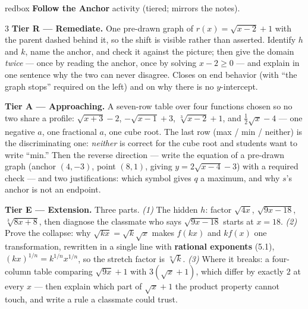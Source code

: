 \documentclass[10pt]{article}
\begin{document}
\begin{skillbox}{redbox}
\textbf{Follow the Anchor} activity (tiered; mirrors the notes).
\begin{multicols}{3}
\textbf{Tier R --- Remediate.} One pre-drawn graph of $r(x)=\sqrt{x-2}+1$ with the parent dashed
behind it, so the shift is visible rather than asserted. Identify $h$ and $k$, name the anchor, and
check it against the picture; then give the domain \emph{twice} --- once by reading the anchor, once
by solving $x-2\ge0$ --- and explain in one sentence why the two can never disagree. Closes on end
behavior (with ``the graph stops'' required on the left) and on why there is no $y$-intercept.

\columnbreak
\textbf{Tier A --- Approaching.} A seven-row table over four functions chosen so no two share a
profile: $\sqrt{x+3}-2$, $-\sqrt{x-1}+3$, $\sqrt[3]{x-2}+1$, and $\frac12\sqrt{x}-4$ --- one negative
$a$, one fractional $a$, one cube root. The last row (max / min / neither) is the discriminating one:
\emph{neither} is correct for the cube root and students want to write ``min.'' Then the reverse
direction --- write the equation of a pre-drawn graph (anchor $(4,-3)$, point $(8,1)$, giving
$y=2\sqrt{x-4}-3$) with a required check --- and two justifications: which symbol gives $q$ a maximum,
and why $s$'s anchor is not an endpoint.

\columnbreak
\textbf{Tier E --- Extension.} Three parts. \emph{(1)} The hidden $h$: factor $\sqrt{4x}$,
$\sqrt{9x-18}$, $\sqrt[3]{8x+8}$, then diagnose the classmate who says $\sqrt{9x-18}$ starts at
$x=18$. \emph{(2)} Prove the collapse: why $\sqrt{kx}=\sqrt{k}\sqrt{x}$ makes $f(kx)$ and $kf(x)$ one
transformation, rewritten in a single line with \textbf{rational exponents} (5.1),
$(kx)^{1/n}=k^{1/n}x^{1/n}$, so the stretch factor is $\sqrt[n]{k}$. \emph{(3)} Where it breaks: a
four-column table comparing $\sqrt{9x}+1$ with $3(\sqrt{x}+1)$, which differ by exactly $2$ at every
$x$ --- then explain which part of $\sqrt{x}+1$ the product property cannot touch, and write a rule a
classmate could trust.
\end{multicols}
\end{skillbox}
\end{document}
